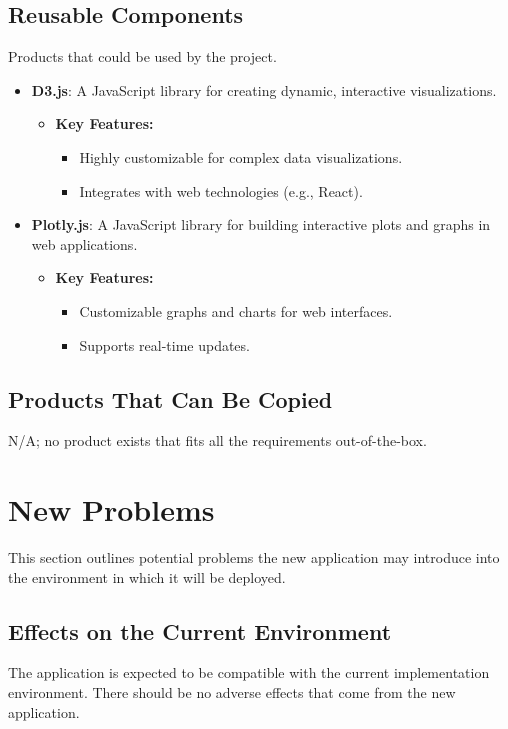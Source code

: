 \documentclass[12pt]{article}
\begin{document}
\subsection{Reusable Components}

Products that could be used by the project.


\begin{itemize}
    \item \textbf{D3.js}: A JavaScript library for creating dynamic, interactive
    visualizations.
    
    \begin{itemize}
        \item \textbf{Key Features:}
        \begin{itemize}
            \item Highly customizable for complex data visualizations.
            \item Integrates with web technologies (e.g., React).
        \end{itemize}
    \end{itemize}

    \item \textbf{Plotly.js}: A JavaScript library for building interactive
    plots and graphs in web applications.
    
    \begin{itemize}
        \item \textbf{Key Features:}
        \begin{itemize}
            \item Customizable graphs and charts for web interfaces.
            \item Supports real-time updates.
        \end{itemize}
    \end{itemize}
\end{itemize}


\subsection{Products That Can Be Copied}
N/A; no product exists that fits all the requirements out-of-the-box.


\section{New Problems}
This section outlines potential problems the new application may introduce into the  environment in which it will be deployed.
\subsection{Effects on the Current Environment}
The application is expected to be compatible with the current implementation environment. There should be no adverse effects that come from the new application.
\end{document}
